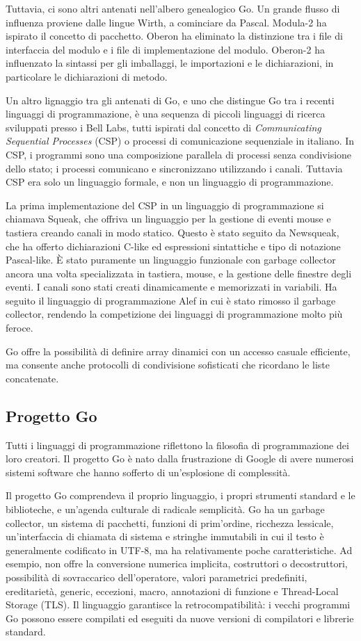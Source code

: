 Tuttavia, ci sono altri antenati nell'albero genealogico Go.
Un grande flusso di influenza proviene dalle lingue Wirth, a cominciare da Pascal.
Modula-2 ha ispirato il concetto di pacchetto.
Oberon ha eliminato la distinzione tra i file di interfaccia del modulo e i file di implementazione del modulo.
Oberon-2 ha influenzato la sintassi per gli imballaggi, le importazioni e le dichiarazioni, in particolare le dichiarazioni di metodo.

Un altro lignaggio tra gli antenati di Go, e uno che distingue Go tra i recenti linguaggi di programmazione, è una sequenza di piccoli linguaggi di ricerca sviluppati presso i Bell Labs, tutti ispirati dal concetto di \textit{Communicating Sequential Processes} (CSP) o processi di comunicazione sequenziale in italiano.
In CSP, i programmi sono una composizione parallela di processi senza condivisione dello stato;
i processi comunicano e sincronizzano utilizzando i canali.
Tuttavia CSP era solo un linguaggio formale, e non un linguaggio di programmazione.

La prima implementazione del CSP in un linguaggio di programmazione si chiamava Squeak, che offriva un linguaggio per la gestione di eventi mouse e tastiera creando canali in modo statico.
Questo è stato seguito da Newsqueak, che ha offerto dichiarazioni C-like ed espressioni sintattiche e tipo di notazione Pascal-like.
È stato puramente un linguaggio funzionale con garbage collector ancora una volta specializzata in tastiera, mouse, e la gestione delle finestre degli eventi.
I canali sono stati creati dinamicamente e memorizzati in variabili.
Ha seguito il linguaggio di programmazione Alef in cui è stato rimosso il garbage collector, rendendo la competizione dei linguaggi di programmazione molto più feroce.

Go offre la possibilità di definire array dinamici con un accesso casuale efficiente, ma consente anche protocolli di condivisione sofisticati che ricordano le liste concatenate.

\subsection*{Progetto Go}
Tutti i linguaggi di programmazione riflettono la filosofia di programmazione dei loro creatori.
Il progetto Go è nato dalla frustrazione di Google di avere numerosi sistemi software che hanno sofferto di un'esplosione di complessità.

Il progetto Go comprendeva il proprio linguaggio, i propri strumenti standard e le biblioteche, e un'agenda culturale di radicale semplicità.
Go ha un garbage collector, un sistema di pacchetti, funzioni di prim'ordine, ricchezza lessicale, un'interfaccia di chiamata di sistema e stringhe immutabili in cui il testo è generalmente codificato in UTF-8, ma ha relativamente poche caratteristiche.
Ad esempio, non offre la conversione numerica implicita, costruttori o decostruttori, possibilità di sovraccarico dell'operatore, valori parametrici predefiniti, ereditarietà, generic, eccezioni, macro, annotazioni di funzione e Thread-Local Storage (TLS).
Il linguaggio garantisce la retrocompatibilità: i vecchi programmi Go possono essere compilati ed eseguiti da nuove versioni di compilatori e librerie standard.

